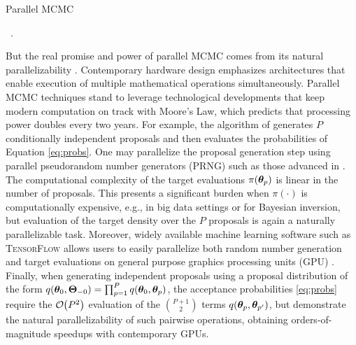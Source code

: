 \documentclass[12pt]{article} %
\newcommand{\order}[1]{{\cal O}\hspace{-0.2em}\left( #1 \right)}
\begin{document}
\begin{algorithm}[t!]
	\caption{Parallel MCMC \citep{tjelmeland2004using}}\label{alg:pMCMC}
	\ .
	\vspace{0.5em}
	
\end{algorithm}

But the real promise and power of parallel MCMC comes from its natural parallelizability \citep{calderhead2014general}.  Contemporary hardware design emphasizes architectures that enable execution of multiple mathematical operations simultaneously. Parallel MCMC techniques stand to leverage technological developments that keep modern computation on track with Moore's Law, which predicts that processing power doubles every two years.  For example, the algorithm of \citet{tjelmeland2004using} generates $P$ conditionally independent proposals and then evaluates the probabilities of Equation \eqref{eq:probs}.  One may parallelize the proposal generation step using parallel pseudorandom number generators (PRNG) such as those advanced in \citet{salmon2011parallel}. The computational complexity of the target evaluations $\pi(\boldsymbol{\theta}_p)$ is linear in the number of proposals. This presents a significant burden when $\pi(\cdot)$ is computationally expensive, e.g., in big data settings or for Bayesian inversion, but evaluation of the target density over the $P$ proposals is again a naturally parallelizable task.  Moreover, widely available machine learning software such as \textsc{TensorFlow} allows users to easily parallelize both random number generation and target evaluations on general purpose graphics processing units (GPU) \citep{lao2020tfp}. Finally, when generating independent proposals using a proposal distribution of the form $q(\boldsymbol{\theta}_0,\boldsymbol{\Theta}_{-0})=\prod_{p=1}^Pq(\boldsymbol{\theta}_0,\boldsymbol{\theta}_{p})$, the acceptance probabilities \eqref{eq:probs} require the $\order{P^2}$ evaluation of the $P+1\choose 2$ terms $q(\boldsymbol{\theta}_{p},\boldsymbol{\theta}_{p'})$, but \citet{massive,holbrook2021scalable} demonstrate the natural parallelizability of such pairwise operations, obtaining orders-of-magnitude speedups with contemporary GPUs.
\end{document}
